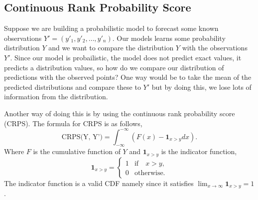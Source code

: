 \documentclass{article}
\begin{document}
\subsection{Continuous Rank Probability Score}

Suppose we are building a probabilistic model to forecast some known observations $Y' = (y'_1, y'_2, \dots, y'_n)$. Our models learns some probability distribution $Y$ and we want to compare the distribution $Y$ with the observations $Y'$. Since our model is probailistic, the model does not predict exact values, it predicts a distribution values, so how do we compare our distribution of predictions with the observed points? One way would be to take the mean of the predicted distributions and compare these to $Y'$ but by doing this, we lose lots of information from the distribution.

Another way of doing this is by using the continuous rank probability score (CRPS). The formula for CRPS is as follows,
\begin{equation}
    \text{CRPS(Y, Y')} =
    \int_{-\infty}^{-\infty} (F(x) - \mathbf{1}_{x>y} dx).
\end{equation}
Where $F$ is the cumulative function of $Y$ and $\mathbf{1}_{x>y}$ is the indicator function,
\begin{equation}
    \mathbf{1}_{x > y} =
    \begin{cases}
        1 & \text{if} \quad x > y, \\
        0 & \text{otherwise.}
    \end{cases}
\end{equation}
The indicator function is a valid CDF namely since it satisfies $\lim_{x \rightarrow \infty} \mathbf{1}_{x > y} = 1$.



\end{document}
